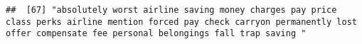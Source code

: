 \documentclass[
]{article}
\begin{document}
\begin{verbatim}
##  [67] "absolutely worst airline saving money charges pay price class perks airline mention forced pay check carryon permanently lost offer compensate fee personal belongings fall trap saving "                                                                                                                                                                                                                                                                                                                                                                                                                                                                                                                                                                                                                                                                                                                                                                                                                                                                                                                                                                                                                                                                                                                                                                                                                                                                                                                                                                                                                                                                                                                                                                                                      

\end{verbatim}
\end{document}
